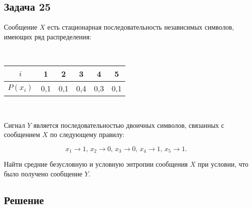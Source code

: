 \documentclass[oneside, final, 12pt]{extarticle}
\begin{document}
\subsection{Задача 25}
Сообщение \(X\) есть стационарная последовательность независимых символов, имеющих ряд распределения:

~

\begin{tabular}{|c|c|c|c|c|c|} \hline
	\(i\) & 1 & 2 & 3 & 4 & 5 \\ \hline
	\(P(x_i)\) & 0,1 & 0,1 & 0,4 & 0,3 & 0,1 \\ \hline
\end{tabular}

~

Сигнал \(Y\) является последовательностью двоичных символов, связанных с сообщением \(X\) по следующему правилу:

\[x_1 \rightarrow 1,\,x_2 \rightarrow 0,\,x_3 \rightarrow 0,\,x_4 \rightarrow 1,\,x_5 \rightarrow 1.\]

Найти средние безусловную и условную энтропии сообщения \(X\) при условии, что было получено сообщение \(Y\).

\subsection*{Решение}
\end{document}
